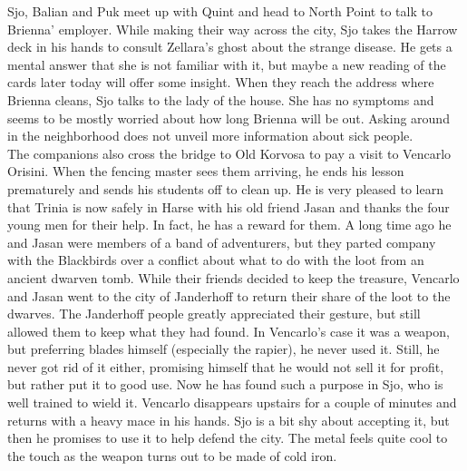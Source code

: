 Sjo, Balian and Puk meet up with Quint and head to North Point to talk to Brienna' employer. While making their way across the city, Sjo takes the Harrow deck in his hands to consult Zellara's ghost about the strange disease. He gets a mental answer that she is not familiar with it, but maybe a new reading of the cards later today will offer some insight. When they reach the address where Brienna cleans, Sjo talks to the lady of the house. She has no symptoms and seems to be mostly worried about how long Brienna will be out. Asking around in the neighborhood does not unveil more information about sick people.\\

The companions also cross the bridge to Old Korvosa to pay a visit to Vencarlo Orisini. When the fencing master sees them arriving, he ends his lesson prematurely and sends his students off to clean up. He is very pleased to learn that Trinia is now safely in Harse with his old friend Jasan and thanks the four young men for their help. In fact, he has a reward for them. A long time ago he and Jasan were members of a band of adventurers, but they parted company with the Blackbirds over a conflict about what to do with the loot from an ancient dwarven tomb. While their friends decided to keep the treasure, Vencarlo and Jasan went to the city of Janderhoff to return their share of the loot to the dwarves. The Janderhoff people greatly appreciated their gesture, but still allowed them to keep what they had found. In Vencarlo's case it was a weapon, but preferring blades himself (especially the rapier), he never used it. Still, he never got rid of it either, promising himself that he would not sell it for profit, but rather put it to good use. Now he has found such a purpose in Sjo, who is well trained to wield it. Vencarlo disappears upstairs for a couple of minutes and returns with a heavy mace in his hands. Sjo is a bit shy about accepting it, but then he promises to use it to help defend the city. The metal feels quite cool to the touch as the weapon turns out to be made of cold iron.\\


